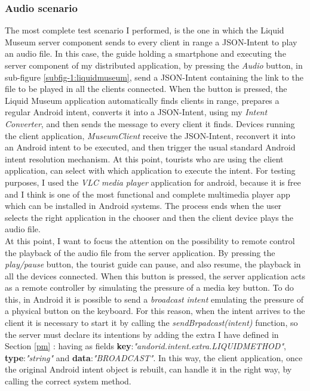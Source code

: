 \subsubsection{Audio scenario}
The most complete test scenario I performed, is the one in which the Liquid Museum server component sends to every client in range a JSON-Intent to play an audio file. In this case, the guide holding a smartphone and executing the server component of my distributed application, by pressing the \textit{Audio} button, in sub-figure \ref{subfig-1:liquidmuseum}, send a JSON-Intent containing the link to the file to be played in all the clients connected. When the button is pressed, the Liquid Museum application automatically finds clients in range, prepares a regular Android intent, converts it into a JSON-Intent, using my \textit{Intent Converter}, and then sends the message to every client it finds. Devices running the client application, \textit{MuseumClient} receive the JSON-Intent, reconvert it into an Android intent to be executed, and then trigger the usual standard Android intent resolution mechanism. At this point, tourists who are using the client application, can select with which application to execute the intent. For testing purposes, I used the \textit{VLC media player} application for android, because it is free and I think is one of the most functional and complete multimedia player app which can be installed in Android systems. The process ends when the user selects the right application in the chooser and then the client device plays the audio file.\\
At this point, I want to focus the attention on the possibility to remote control the playback of the audio file from the server application. By pressing the \textit{play/pause} button, the tourist guide can pause, and also resume, the playback in all the devices connected. When this button is pressed, the server application acts as a remote controller by simulating the pressure of a media key button. To do this, in Android it is possible to send a \textit{broadcast intent} emulating the pressure of a physical button on the keyboard. For this reason, when the intent arrives to the client it is necessary to start it by calling the \textit{sendBrpadcast(intent)} function, so the server must declare its intentions by adding the extra I have defined in Section \ref{pm} : having as fields \textbf{key}:\textit{"andorid.intent.extra.LIQUIDMETHOD"}, \textbf{type}:\textit{"string"} and \textbf{data}:\textit{"BROADCAST"}. In this way, the client application, once the original Android intent object is rebuilt, can handle it in the right way, by calling the correct system method.

